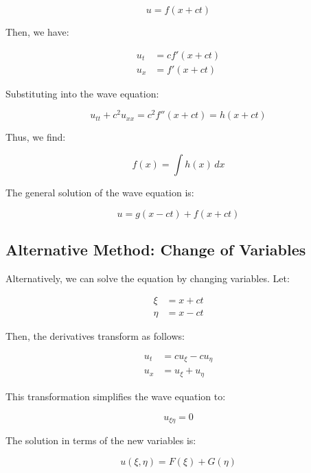 \documentclass[11pt]{article}
\begin{document}
\begin{equation}
    u = f(x + ct)
\end{equation}

Then, we have:

\begin{align}
    u_t &= c f'(x + ct) \\
    u_x &= f'(x + ct)
\end{align}

Substituting into the wave equation:

\begin{equation}
    u_{tt} + c^2 u_{xx} = c^2 f''(x + ct) = h(x + ct)
\end{equation}

Thus, we find:

\begin{equation}
    f(x) = \int h(x) \, dx
\end{equation}

The general solution of the wave equation is:

\begin{equation}
    u = g(x - ct) + f(x + ct)
\end{equation}

\subsection*{Alternative Method: Change of Variables}

Alternatively, we can solve the equation by changing variables. Let:

\begin{align}
    \xi &= x + ct \\
    \eta &= x - ct
\end{align}

Then, the derivatives transform as follows:

\begin{align}
    u_t &= c u_\xi - c u_\eta \\
    u_x &= u_\xi + u_\eta
\end{align}

This transformation simplifies the wave equation to:

\begin{equation}
    u_{\xi \eta} = 0
\end{equation}

The solution in terms of the new variables is:

\begin{equation}
    u(\xi, \eta) = F(\xi) + G(\eta)
\end{equation}
\end{document}
